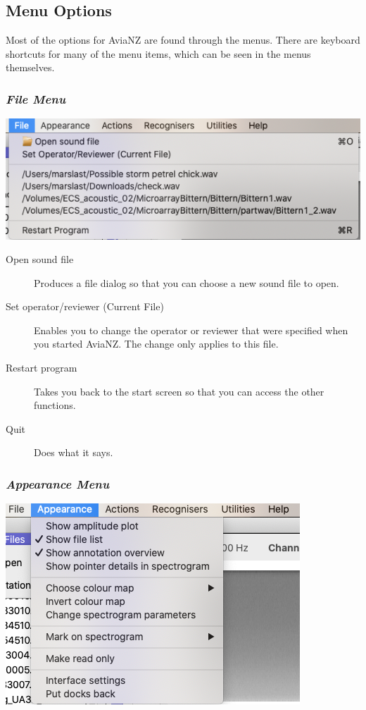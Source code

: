 \documentclass{article}
\begin{document}
\subsection{Menu Options}	

Most of the options for AviaNZ are found through the menus. There are keyboard shortcuts for many of the menu items, which can be seen in the menus themselves. 

\subsubsection{{\em File Menu}}

\begin{center}
\includegraphics[width=.3\textwidth]{Figures/FileMenu}
\end{center}

\begin{description}
\item[Open sound file] Produces a file dialog so that you can choose a new sound file to open.
\item[Set operator/reviewer (Current File)] Enables you to change the operator or reviewer that were specified when you started AviaNZ. The change only applies to this file. 
\item[Restart program] Takes you back to the start screen so that you can access the other functions.
\item[Quit] Does what it says.
\end{description}

\subsubsection{{\em Appearance Menu}}

\begin{center}
\includegraphics[width=.3\textwidth]{Figures/AppearanceMenu}
\end{center}
\end{document}
